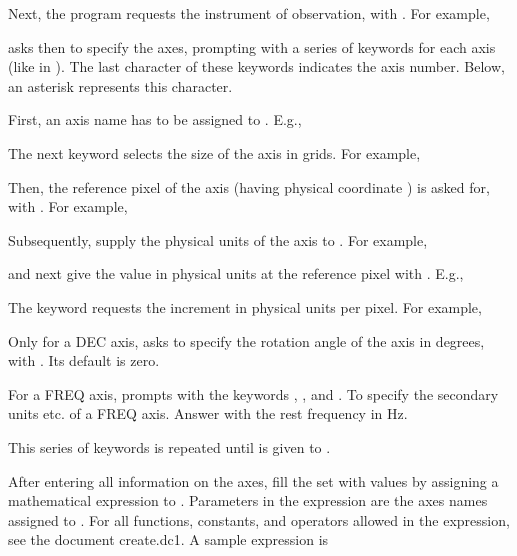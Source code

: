 Next, the program requests the instrument of observation, with
.  For example,


 asks then to specify the axes, prompting with a series
of keywords for each axis (like in ).  The last character
of these keywords indicates the axis number.  Below, an asterisk
represents this character. 

First, an axis name has to be assigned to . E.g.,


The next keyword  selects the size of the axis in
grids.  For example,


Then, the reference pixel of the axis (having physical coordinate
) is asked for, with .  For example,


Subsequently, supply the physical units of the axis to
.  For example,


and next give the value in physical units at the reference pixel with
.  E.g.,


The keyword  requests the increment in physical units
per pixel.  For example,


Only for a DEC axis,  asks to specify the rotation angle
of the axis in degrees, with .  Its default is zero. 

For a FREQ axis,  prompts with the keywords
, , and .  To specify
the secondary units etc.  of a FREQ axis.  Answer  with
the rest frequency in Hz. 

This series of keywords is repeated until \carr is given to
. 

After entering all information on the axes, fill the set with values by
assigning a mathematical expression to .  Parameters
in the expression are the axes names assigned to .  For
all functions, constants, and operators allowed in the expression, see
the document create.dc1.  A sample expression is

